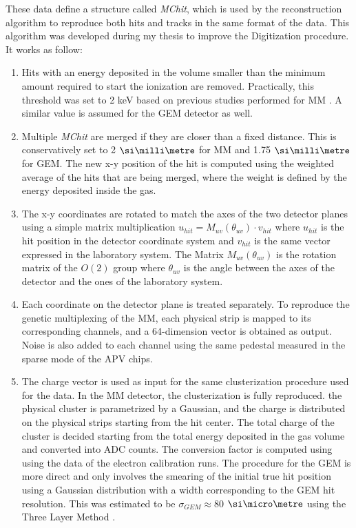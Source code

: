 These data define a structure called \textit{MChit}, which is used by the reconstruction algorithm to reproduce both hits and tracks in the same format of the data. This algorithm was developed during my thesis to improve the Digitization procedure. It works as follow:
\begin{enumerate}

\item Hits with an energy deposited in the volume smaller than the minimum amount required to start the ionization are removed. Practically, this threshold was set to 2 keV based on previous studies performed for MM \cite{IGUAZ20121079}. A similar value is assumed for the GEM detector as well.
\item Multiple \textit{MChit} are merged if they are closer than a fixed distance. This is conservatively set to 2 $\mmi$  for MM and 1.75 $\mmi$  for GEM. The new x-y position of the hit is computed using the weighted average of the hits that are being merged, where the weight is defined by the energy deposited inside the gas.
\item The x-y coordinates are rotated to match the axes of the two detector planes using a simple matrix multiplication $u_{hit} = M_{uv}(\theta_{uv}) \cdot v_{hit}$ where $u_{hit}$ is the hit position in the detector coordinate system and $v_{hit}$ is the same vector expressed in the laboratory system. The Matrix $M_{uv}(\theta_{uv})$ is the rotation matrix of the $O(2)$ group where $\theta_{uv}$ is the angle between the axes of the detector and the ones of the laboratory system.
\item Each coordinate on the detector plane is treated separately. To reproduce the genetic multiplexing of the MM, each physical strip is mapped to its corresponding channels, and a 64-dimension vector is obtained as output. Noise is also added to each channel using the same pedestal measured in the sparse mode of the APV chips.
\item  The charge vector is used as input for the same clusterization procedure used for the data. In the MM detector, the clusterization is fully reproduced. the physical cluster is parametrized by a Gaussian, and the charge is distributed on the physical strips starting from the hit center. The total charge of the cluster is decided starting from the total energy deposited in the gas volume and converted into ADC counts. The conversion factor is computed using using the data of the electron calibration runs. The procedure for the GEM is more direct and only involves the smearing of the initial true hit position using a Gaussian distribution with a width corresponding to the GEM hit resolution. This was estimated to be $\sigma_{GEM} \approx 80$ $\mum$ using the Three Layer Method \cite{Bortfeldt:2014vvt}.

\end{enumerate}
